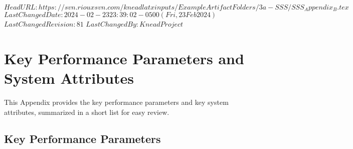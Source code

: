 \svnidlong
{$HeadURL: https://svn.riouxsvn.com/kneadlatxinputs/ExampleArtifactFolders/3a-SSS/SSS_Appendix_B.tex $}
{$LastChangedDate: 2024-02-23 23:39:02 -0500 (Fri, 23 Feb 2024) $}
{$LastChangedRevision: 81 $}
{$LastChangedBy: KneadProject $}

\chapter{Key Performance Parameters and System Attributes}
\label{lab:chap_Bspec}

This Appendix provides the key performance parameters and key system attributes, summarized in a short list for easy review.

\KNEADSECTIONNEWPAGE
\section{Key Performance Parameters}
\label{lab:sec_Bspec_KPP}

